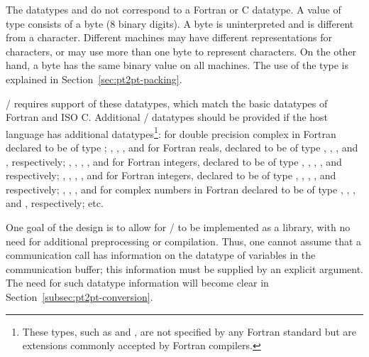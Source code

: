 The datatypes  and  do not correspond to a
Fortran or C datatype.  A value of type  consists of a byte
(8 binary digits).  A
byte is uninterpreted and is different from a character.
Different machines may have
different representations for characters, or may use more than one
byte to represent characters.  On the other hand, a byte has the same
binary value on all machines.
The use of the type  is explained in
Section~\ref{sec:pt2pt-packing}.

\MPI/ requires support of
these datatypes,
which match the basic
datatypes of
Fortran and ISO C.
Additional \MPI/ datatypes should be provided if the host language has
additional datatypes\footnote{These types, such as  and , are not specified by any Fortran standard but are extensions commonly accepted by Fortran compilers.}:
 for double precision complex in
Fortran declared to be of type ;
,
, , and  for Fortran reals, declared to be of
type , , , and , respectively;
, , ,
, and  for Fortran integers, declared to be of type
, , , , and  respectively;
, , ,
, and  for Fortran integers, declared to be of type
, , , , and  respectively;
,
,
,
and
for complex numbers in Fortran declared to be of type
,
,
,
and
,
respectively;
etc.

\begin{rationale}
One goal of the design is to allow for \MPI/ to be implemented as a library,
with no need for additional preprocessing or compilation.
Thus, one cannot assume that a communication call has information on the
datatype of variables in the communication buffer; this information must be
supplied by an explicit argument.
The need for such datatype information will become clear in
Section~\ref{subsec:pt2pt-conversion}.
\end{rationale}

